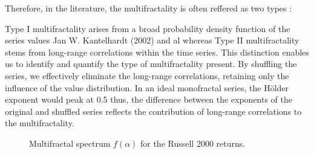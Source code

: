 \documentclass[11pt]{extarticle}
\begin{document}
Therefore, in the literature, the multifractality is often reffered as two types :

Type I multifractality arises
from a broad probability density function of the series values Jan W. Kantelhardt (2002) and al whereas Type II
multifractality stems from long-range correlations within the time series. This distinction enables us to identify and quantify
the type of multifractality present. By shuffling the series, we effectively eliminate the long-range correlations,
retaining only the influence of the value distribution. In an ideal monofractal series, the Hölder exponent would peak
at 0.5 thus, the difference between the exponents of the original and shuffled series reflects the contribution of
long-range correlations to the multifractality.


\begin{figure}[htbp]
    \centering
    \caption{Multifractal spectrum $f(\alpha)$ for the Russell 2000 returns.}
\end{figure}

\FloatBarrier
\end{document}

